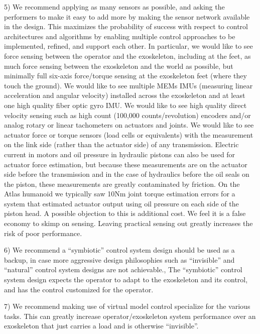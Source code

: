 \documentclass[letterpaper,12pt,fullpage]{article}
\begin{document}
5) We recommend applying as many sensors as possible, and asking the performers
to make it easy to add more by making the sensor network available in the design.
This maximizes the probability of success
with respect to control architectures and algorithms by enabling multiple control
approaches to be implemented, refined, and support each other.
In particular, we would like to see force sensing between the operator and the
exoskeleton, including at the feet, as much force sensing between the exoskeleton 
and the world as possible, but minimally full six-axis force/torque sensing at
the exoskeleton feet (where they touch the ground). We would like to see multiple MEMs
IMUs (measuring linear acceleration and angular velocity) installed across 
the exoskeleton and at least one high quality fiber optic gyro IMU. 
We would like to see high quality direct velocity sensing
such as high count (100,000 counts/revolution) encoders and/or 
analog rotary or linear tachometers on actuators and joints. 
We would like to see actuator force or torque sensors
(load cells or equivalents) with the measurement on the link side (rather than
the actuator side) of any transmission. Electric current in motors and oil
pressure in hydraulic pistons can also be used for actuator force estimation,
but because these measurements are on the actuator side before the transmission
and in the case of hydraulics before the oil seals on the piston, these measurements
are greatly contaminated by friction. On the Atlas humanoid we typically saw 10Nm
joint torque estimation errors for a system that estimated actuator output using
oil pressure on each side of the piston head.
A possible objection to this is additional cost. We feel it is a false
economy to skimp on sensing. Leaving practical sensing out greatly increases
the risk of poor performance.

6) We recommend a ``symbiotic'' control system design should be used as a backup,
in case more aggressive design philosophies such as ``invisible'' and ``natural''
control system designs are not achievable.,
The ``symbiotic'' control system design
expects the operator to adapt to the exoskeleton and its control,
and has the control customized for the operator.

7) We recommend making use of virtual model control specialize
for the various tasks. This can greatly increase operator/exoskeleton system
performance over an exoskeleton that just carries a load and is otherwise
``invisible''.



\end{document}
